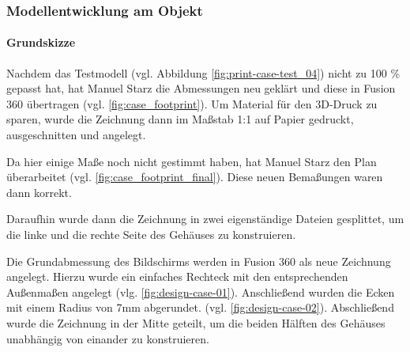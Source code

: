 \subsubsection{Modellentwicklung am Objekt}
\paragraph{Grundskizze}
Nachdem das Testmodell (vgl. Abbildung \ref{fig:print-case-test_04}) nicht zu 100 \% gepasst hat, hat Manuel Starz die Abmessungen neu geklärt und diese in Fusion 360 übertragen (vgl. \ref{fig:case_footprint}). Um Material für den 3D-Druck zu sparen, wurde die Zeichnung dann im Maßstab 1:1 auf Papier gedruckt, ausgeschnitten und angelegt.\par
Da hier einige Maße noch nicht gestimmt haben, hat Manuel Starz den Plan überarbeitet (vgl. \ref{fig:case_footprint_final}). Diese neuen Bemaßungen waren dann korrekt.\par
Daraufhin wurde dann die Zeichnung in zwei eigenständige Dateien gesplittet, um die linke und die rechte Seite des Gehäuses zu konstruieren.\par
Die Grundabmessung des Bildschirms werden in Fusion 360 als neue Zeichnung angelegt. Hierzu wurde ein einfaches Rechteck mit den entsprechenden Außenmaßen angelegt (vlg. \ref{fig:design-case-01}). Anschließend wurden die Ecken mit einem Radius von 7mm abgerundet. (vgl. \ref{fig:design-case-02}). Abschließend wurde die Zeichnung in der Mitte geteilt, um die beiden Hälften des Gehäuses unabhängig von einander zu konstruieren.\par
